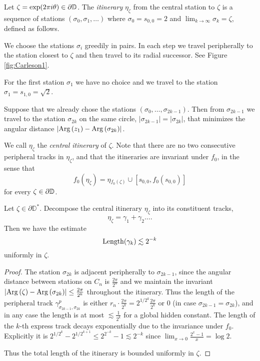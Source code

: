 \begin{definition}
Let $\zeta=\exp(2\pi i\theta)\in\partial\mathbb{D}$. The \emph{itinerary} $\eta_\zeta$ from the central station to $\zeta$ is a sequence of stations $\left(\sigma_{0},\sigma_{1},\ldots\right)$ where $\sigma_{0}=s_{0,0}=2$ and $\lim_{k\to \infty} \sigma_{k}=\zeta$, defined as follows.

We choose the stations $\sigma_{i}$ greedily in pairs. In each step
we travel peripherally to the station closest to $\zeta$ and then
travel to its radial successor. See Figure \ref{fig:Carleson1}. 

For the first station $\sigma_{1}$ we have no choice and we travel
to the station $\sigma_{1}=s_{1,0}=\sqrt{2}$.

Suppose that we already chose the stations $\left(\sigma_{0},\ldots,\sigma_{2k-1}\right)$.
Then from $\sigma_{2k-1}$ we travel to the station $\sigma_{2k}$
on the same circle, $\left|\sigma_{2k-1}\right|=\left|\sigma_{2k}\right|$,
that minimizes the angular distance $\left|\operatorname{Arg}\left(z_{1}\right)-\operatorname{Arg}\left(\sigma_{2k}\right)\right|$. 

\end{definition} 

We call $\eta_{\zeta}$ the \emph{central itinerary} of $\zeta$.
Note that there are no two consecutive peripheral tracks in $\eta_{\zeta}$, and that the itineraries are invariant under $f_{0}$, in the sense that $$f_{0}(\eta_{\zeta})=\eta{}_{f_{0}(\zeta)}\cup[s_{0,0},f_0(s_{0,0})]$$
for every $\zeta\in\partial\mathbb{D}$.

\begin{lemma}
Let $\zeta\in \partial \mathbb D^*$. Decompose the central itinerary $\eta_{\zeta}$ into its constituent tracks, 
$$\eta_{\zeta}=\gamma _1 + \gamma_2\ldots .$$ 
	Then we have the estimate $$\operatorname{Length}(\gamma_{k})\lesssim2^{-k}$$ uniformly in $\zeta$. 

\end{lemma}


\begin{proof}
The station $\sigma_{2k}$ is adjacent peripherally to $\sigma_{2k-1}$,
since the angular distance between stations on $C_{n}$ is $\frac{2\pi}{2^{n}}$
and we maintain the invariant $\left|\operatorname{Arg}\left(\zeta\right)-\operatorname{Arg}\left(\sigma_{2k}\right)\right|\leq\frac{2\pi}{2^{k}}$
throughout the itinerary. Thus the length of the peripheral track $\gamma_{\sigma_{2k-1},\sigma_{2k}}^{p}$
is either $r_{n}\cdot\frac{2\pi}{2^{k}}=2^{1/2^{k}}\frac{2\pi}{2^{k}}$
or $0$ (in case $\sigma_{2k-1}=\sigma_{2k}$), and in any case the
length is at most $\lesssim\frac{1}{2^{k}}$ for a global hidden constant.
The length of the $k$-th express track decays exponentially due to
the invariance under $f_{0}$. Explicitly it is $2^{1/2^{k}}-2^{1/2^{k+1}}\leq2^{2^{-k}}-1\lesssim2^{-k}$
since $\lim_{x\to0}\frac{2^{x}-1}{x}=\log2$.

Thus the total length of the itinerary is bounded uniformly in $\zeta$.
\end{proof}

